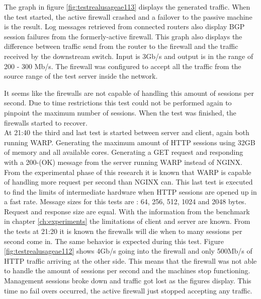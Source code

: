 The graph in figure \ref{fig:testrealusageae113} displays the generated traffic. When the test started, the active firewall crashed and a failover to the passive machine is the result. Log messages retrieved from connected routers also display BGP session failures from the formerly-active firewall. 
This graph also displays the difference between traffic send from the router to the firewall and the traffic received by the downstream switch. 
Input is 3Gb/s and output is in the range of 200 - 300 Mb/s. The firewall was configured to accept all the traffic from the source range of the test server inside the network.

It seems like the firewalls are not capable of handling this amount of sessions per second. Due to time restrictions this test could not be performed again to pinpoint the maximum number of sessions.  
When the test was finished, the firewalls started to recover. \\ 

At 21:40 the third and last test is started between server and client, again both running WARP. 
Generating the maximum amount of HTTP sessions using 32GB of memory and all available cores.
Generating a GET request and responding with a 200-(OK) message from the server running WARP instead of NGINX.  
From the experimental phase of this research it is known that WARP is capable of handling more request per second than NGINX can. This last test is executed to find the limits of intermediate hardware when HTTP sessions are opened up in a fast rate.
Message sizes for this tests are : 64, 256, 512, 1024 and 2048 bytes. Request and response size are equal. 
With the information from the benchmark in chapter \ref{ch:experiments} the limitations of client and server are known. 
From the tests at 21:20 it is known the firewalls will die when to many sessions per second come in. The same behavior is expected during this test.
Figure \ref{fig:testrealusageae112} shows 4Gb/s going into the firewall and only 500Mb/s of HTTP traffic arriving at the other side.
This means that the firewall was not able to handle the amount of sessions per second and the machines stop functioning. 
Management sessions broke down and traffic got lost as the figures display.
This time no fail overs occurred, the active firewall just stopped accepting any traffic. 


